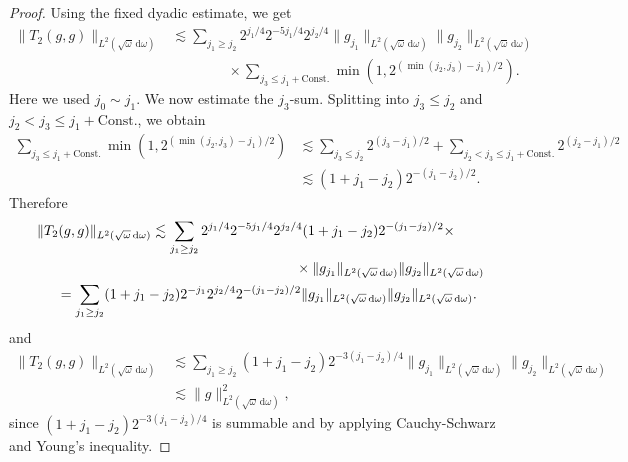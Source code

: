 \documentclass[10pt,a4paper]{amsart}
\newcommand{\dd}{{\, \mathrm d}}
\begin{document}
\begin{proof}
Using the fixed dyadic estimate, we get
\begin{align*}
\|T_2(g,g)\|_{L^2(\sqrt{\omega}\dd\omega)}
&\lesssim
\sum_{j_1\ge j_2}
2^{j_1/4}
2^{-5j_1/4}
2^{j_2/4}
\|g_{j_1}\|_{L^2(\sqrt{\omega}\dd\omega)} \|g_{j_2}\|_{L^2(\sqrt{\omega}\dd\omega)} 
\\
&\qquad\qquad\times
\sum_{j_3\le j_1+\text{Const.}}
\min\left(1,2^{(\min(j_2,j_3)-j_1)/2}\right).
\end{align*}
Here we used $j_0\sim j_1$. We now estimate the
$j_3$-sum. Splitting into
$j_3\le j_2$ and $j_2<j_3\le j_1+\text{Const.}$, we obtain
\begin{align*}
\sum_{j_3\le j_1+\text{Const.}}
\min\left(1,2^{(\min(j_2,j_3)-j_1)/2}\right)
&\lesssim
\sum_{j_3\le j_2}2^{(j_3-j_1)/2}
+ \sum_{j_2<j_3\le j_1+\text{Const.}}2^{(j_2-j_1)/2}
\\
&\lesssim
(1+j_1-j_2)2^{-(j_1-j_2)/2}.
\end{align*}
Therefore
\begin{align*}
&\|T_2(g,g)\|_{L^2(\sqrt{\omega}\dd\omega)}
\lesssim
\sum_{j_1\ge j_2}
2^{j_1/4} 2^{-5j_1/4} 2^{j_2/4}
(1+j_1-j_2)2^{-(j_1-j_2)/2}\times \\
&\hskip 6.5cm \times \|g_{j_1}\|_{L^2(\sqrt{\omega}\dd\omega)} \|g_{j_2}\|_{L^2(\sqrt{\omega}\dd\omega)} 
\\
&\hskip 0.5cm=
\sum_{j_1\ge j_2}
(1+j_1-j_2) 2^{-j_1} 2^{j_2/4} 2^{-(j_1-j_2)/2}
\|g_{j_1}\|_{L^2(\sqrt{\omega}\dd\omega)} \|g_{j_2}\|_{L^2(\sqrt{\omega}\dd\omega)}.
\end{align*}
and 
\begin{align*}
\|T_2(g,g)\|_{L^2(\sqrt{\omega}\dd\omega)}
&\lesssim
\sum_{j_1\ge j_2}
(1+j_1-j_2)2^{-3(j_1-j_2)/4}
\|g_{j_1}\|_{L^2(\sqrt{\omega}\dd\omega)} \|g_{j_2}\|_{L^2(\sqrt{\omega}\dd\omega)}\\
&\lesssim
\|g\|_{L^2(\sqrt{\omega}\dd\omega)}^2, 
\end{align*}
since $(1+j_1-j_2)2^{-3(j_1-j_2)/4}$ is summable and by applying Cauchy-Schwarz and Young's inequality. 


\end{proof}
\end{document}
